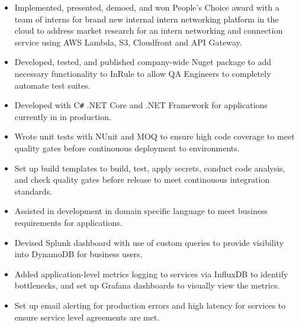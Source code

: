 \documentclass[overlapped]{res}
\begin{document}
\begin{resume}
\begin{itemize}
                  \item Implemented, presented, demoed, and won People's Choice
                   award with a team of interns for brand new internal intern
                   networking platform in the cloud to
                   address market research for an intern
                   networking and connection service using
                   AWS Lambda, S3, Cloudfront and API Gateway.

                  \item Developed, tested, and published
                  company-wide Nuget package to add
                  necessary functionality to InRule
                  to allow QA Engineers to completely automate test suites.

                  \item Developed with C\texttt{\#} .NET Core and .NET Framework
                  for applications currently in in production.

                  \item Wrote unit tests with NUnit and MOQ to ensure high code coverage
                  to meet quality gates before continouous deployment
                   to environments.

                  \item Set up build templates to build,
                  test, apply secrets, conduct code analysis,
                  and check quality gates before release to meet
                  continouous integration standards.

                  \item Assisted in development in domain
                  specific language to meet business requirements for applications.

                  \item Devised Splunk dashboard with use of
                  custom queries to provide
                   visibility into DynamoDB for business users.

                  \item Added application-level
                  metrics logging to services via InfluxDB to identify bottlenecks,
                  and set up Grafana dashboards to visually view the metrics.

                  \item Set up email alerting for production errors and high latency
                  for services to ensure service level agreements are met.


\end{itemize}
\end{resume}
\end{document}
